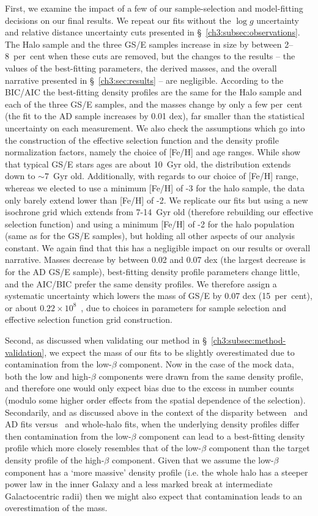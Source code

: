 First, we examine the impact of a few of our sample-selection and model-fitting decisions on our final results. We repeat our fits without the $\log g$ uncertainty and relative distance uncertainty cuts presented in \S~\ref{ch3:subsec:observations}. The Halo sample and the three GS/E samples increase in size by between 2--8~per~cent when these cuts are removed, but the changes to the results -- the values of the best-fitting parameters, the derived masses, and the overall narrative presented in \S~\ref{ch3:sec:results} -- are negligible. According to the BIC/AIC the best-fitting density profiles are the same for the Halo sample and each of the three GS/E samples, and the masses change by only a few per~cent (the fit to the AD sample increases by 0.01 dex), far smaller than the statistical uncertainty on each measurement. We also check the assumptions which go into the construction of the effective selection function and the density profile normalization factors, namely the choice of [Fe/H] and age ranges. While \textcite{montalban21} show that typical GS/E stars ages are about 10~Gyr old, the distribution extends down to $\sim 7$~Gyr old. Additionally, with regards to our choice of [Fe/H] range, whereas we elected to use a minimum [Fe/H] of -3 for the halo sample, the data only barely extend lower than [Fe/H] of -2. We replicate our fits but using a new isochrone grid which extends from 7-14~Gyr old (therefore rebuilding our effective selection function) and using a minimum [Fe/H] of -2 for the halo population (same as for the GS/E samples), but holding all other aspects of our analysis constant. We again find that this has a negligible impact on our results or overall narrative. Masses decrease by between 0.02 and 0.07 dex (the largest decrease is for the AD GS/E sample), best-fitting density profile parameters change little, and the AIC/BIC prefer the same density profiles. We therefore assign a systematic uncertainty which lowers the mass of GS/E by 0.07 dex (15~per~cent), or about $0.22\times10^{8}$~\Msun, due to choices in parameters for sample selection and effective selection function grid construction.

Second, as discussed when validating our method in \S~\ref{ch3:subsec:method-validation}, we expect the mass of our fits to be slightly overestimated due to contamination from the low-$\beta$ component. Now in the case of the mock data, both the low and high-$\beta$ components were drawn from the same density profile, and therefore one would only expect bias due to the excess in number counts (modulo some higher order effects from the spatial dependence of the selection). Secondarily, and as discussed above in the context of the disparity between \eLz\ and AD fits versus \JRLz\ and whole-halo fits, when the underlying density profiles differ then contamination from the low-$\beta$ component can lead to a best-fitting density profile which more closely resembles that of the low-$\beta$ component than the target density profile of the high-$\beta$ component. Given that we assume the low-$\beta$ component has a `more massive' density profile (i.e. the whole halo has a steeper power law in the inner Galaxy and a less marked break at intermediate Galactocentric radii) then we might also expect that contamination leads to an overestimation of the mass.

